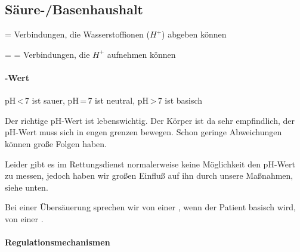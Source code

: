 \subsection{Säure-/Basenhaushalt}

 = Verbindungen, die 
Wasserstoffionen ($H^+$) abgeben können

 =  =
Verbindungen, die $H^+$ aufnehmen können

\paragraph{-Wert}


pH\,{\textless}\,7 ist sauer, pH\,=\,7 ist neutral,
pH\,{\textgreater}\,7 ist basisch


Der richtige pH-Wert ist lebenswichtig. Der Körper ist da sehr
empfindlich, der pH-Wert muss sich in engen grenzen bewegen. Schon
geringe Abweichungen können große Folgen haben. 

Leider gibt es im Rettungsdienst normalerweise keine Möglichkeit den
pH-Wert zu messen, jedoch haben wir großen Einfluß auf ihn
durch unsere Maßnahmen, siehe unten. 

Bei einer Übersäuerung sprechen wir von einer
, wenn der Patient basisch wird, 
von einer .


\paragraph{Regulationsmechanismen}

